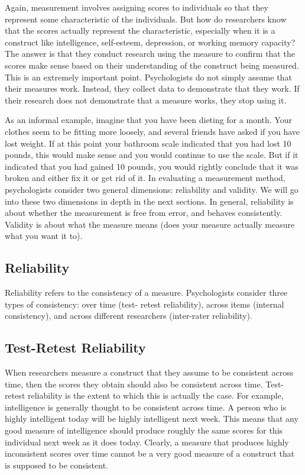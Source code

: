 Again, measurement involves assigning scores to individuals so that they represent some characteristic of the individuals. But how do researchers know that the scores actually represent the characteristic, especially when it is a construct like intelligence, self-esteem, depression, or working memory capacity? The answer is that they conduct research using the measure to confirm that the scores make sense based on their understanding of the construct being measured. This is an extremely important point. Psychologists do not simply assume that their measures work. Instead, they collect data to demonstrate that they work. If their research does not demonstrate that a measure works, they stop using it.

As an informal example, imagine that you have been dieting for a month. Your clothes seem to be fitting more loosely, and several friends have asked if you have lost weight. If at this point your bathroom scale indicated that you had lost 10 pounds, this would make sense and you would continue to use the scale. But if it indicated that you had gained 10 pounds, you would rightly conclude that it was broken and either fix it or get rid of it. In evaluating a measurement method, psychologists consider two general dimensions: reliability and validity. We will go into these two dimensions in depth in the next sections. In general, reliability is about whether the measurement is free from error, and behaves consistently. Validity is about what the measure means (does your measure actually measure what you want it to).

\subsection{Reliability}

Reliability refers to the consistency of a measure. Psychologists consider three types of consistency: over time (test- retest reliability), across items (internal consistency), and across different researchers (inter-rater reliability).

\subsection{Test-Retest Reliability}


When researchers measure a construct that they assume to be consistent across time, then the scores they obtain should also be consistent across time. Test-retest reliability is the extent to which this is actually the case. For example, intelligence is generally thought to be consistent across time. A person who is highly intelligent today will be highly intelligent next week. This means that any good measure of intelligence should produce roughly the same scores for this individual next week as it does today. Clearly, a measure that produces highly inconsistent scores over time cannot be a very good measure of a construct that is supposed to be consistent.

